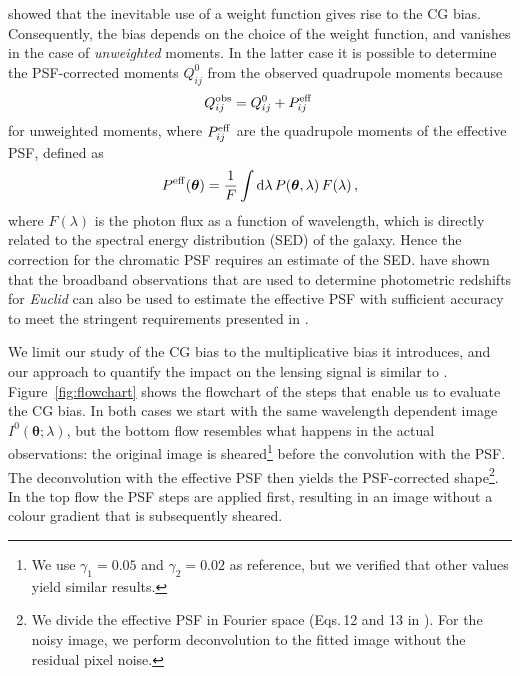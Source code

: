\documentclass[useAMS,usenatbib]{mnras}
\renewcommand{\d}{\mathrm{d}}
\newcommand{\be}{\begin{equation}}
\newcommand{\ee}{\end{equation}}
\begin{document}
 showed that the inevitable use of a weight function gives rise to the CG bias.
Consequently, the bias depends on the choice of the weight function, and vanishes in the case of {\it unweighted} moments. In the latter case it is possible to determine the PSF-corrected moments $Q^0_{ij}$ from the observed quadrupole moments because
%
\be
Q^{\rm obs}_{ij}=Q^0_{ij}+P^{\rm eff}_{ij} \,\label{eq:unweighted}
\ee
%
for unweighted moments, where $P^{\rm eff}_{ij}$ are the quadrupole moments of the effective PSF,  defined as
\be
P^{\rm eff}({\bm \theta}) = \frac{1}{F} \int \d \lambda\, P({\bm \theta},\lambda)\, F(\lambda) \,,
\ee
%
where $F(\lambda)$ is the photon flux as a function of wavelength, which is directly related to the spectral energy distribution (SED) of the galaxy. Hence the correction for the chromatic PSF requires an estimate of the SED.  \cite{Eriksen17} have shown that the broadband observations that are used to determine photometric redshifts for {\it Euclid} can also be used to estimate the effective PSF with sufficient accuracy to meet the stringent requirements presented in \cite{Cropper13}.


We limit our study of the CG bias to the multiplicative bias it introduces, and our approach to quantify
the impact on the lensing signal is similar to . Figure~\ref{fig:flowchart} shows the flowchart of the steps that enable us to evaluate the CG bias.  In both cases we start with the same wavelength dependent image $I^0({\bm \theta};\lambda)$, but the bottom flow resembles what happens in the actual observations: the original image is sheared\footnote{We use
$\gamma_1=0.05$  and $\gamma_2=0.02$ as reference, but we verified that other values yield similar results.} before the convolution with the PSF. The deconvolution with the effective PSF then yields the PSF-corrected shape\footnote{We divide the effective PSF in Fourier space (Eqs.\,12 and 13 in ). For the noisy image, we perform deconvolution to the fitted image without the residual pixel noise.}. In the top flow the PSF steps are applied first, resulting in an image without a colour gradient that is subsequently sheared.
\end{document}
